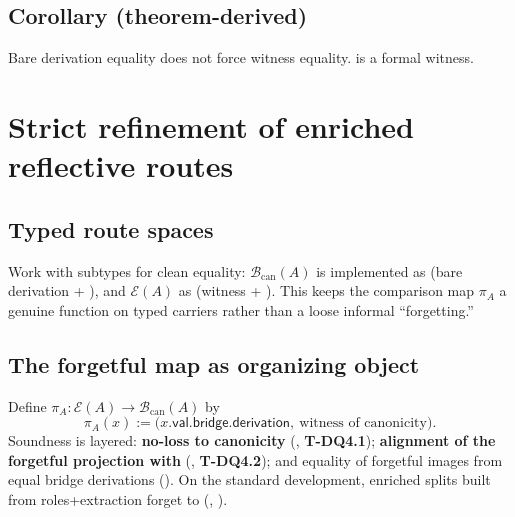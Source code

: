 \documentclass[11pt]{article}
\begin{document}
\subsection{Corollary (theorem-derived)}\label{sec:enriched-realization-interpretation}
\begin{corollary}\label{cor:cert-not-unique}
Bare derivation equality does not force witness equality.  is a formal witness.
\end{corollary}

\section{Strict refinement of enriched reflective routes}\label{sec:strict-refinement}

\subsection{Typed route spaces}\label{sec:strict-refinement-routes}
Work with subtypes for clean equality: $\mathcal{B}_{\mathrm{can}}(A)$ is implemented as  (bare derivation + ), and $\mathcal{E}(A)$ as  (witness + ). This keeps the comparison map $\pi_A$ a genuine function on typed carriers rather than a loose informal ``forgetting.''

\subsection{The forgetful map as organizing object}\label{sec:strict-refinement-forgetful}
Define $\pi_A : \mathcal{E}(A) \to \mathcal{B}_{\mathrm{can}}(A)$ by
\[
  \pi_A(x) := \bigl(x.\mathsf{val}.\mathsf{bridge}.\mathsf{derivation},\ \text{witness of canonicity}\bigr).
\]
Soundness is layered: \textbf{no-loss to canonicity} (, \textbf{T-DQ4.1}); \textbf{alignment of the forgetful projection with } (, \textbf{T-DQ4.2}); and equality of forgetful images from equal bridge derivations (). On the standard development, enriched splits built from roles+extraction forget to  (, ).
\end{document}
